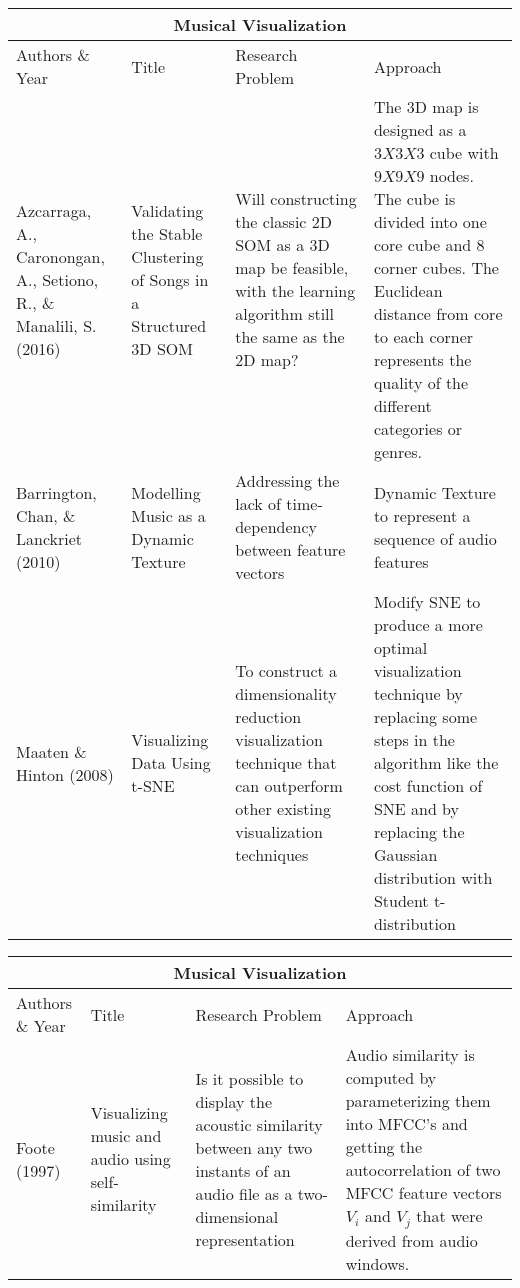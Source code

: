 \begin{center}
\begin{tabular}{ |p{3cm}|p{3cm}|p{3cm}|p{3cm}| }
 \hline
 \multicolumn{4}{|c|}{Musical Visualization} \\
 \hline
 Authors \& Year&Title&Research Problem&Approach\\
\hline
 Azcarraga, A., Caronongan, A., Setiono, R., \& Manalili, S. (2016) & Validating the Stable Clustering of Songs in a Structured 3D SOM & Will constructing the classic 2D SOM as a 3D map be feasible, with the learning algorithm still the same as the 2D map? & The 3D map is designed as a $3X3X3$ cube with $9X9X9$ nodes. The cube is divided into one core cube and 8 corner cubes. The Euclidean distance from core to each corner represents the quality of the different categories or genres. \\
\hline
Barrington, Chan, \& Lanckriet (2010) & Modelling Music as a Dynamic Texture &Addressing the lack of time-dependency between feature vectors & Dynamic Texture to represent a sequence of audio features \\
\hline
Maaten \& Hinton (2008) & Visualizing Data Using t-SNE &To construct a dimensionality reduction visualization technique that can outperform other existing visualization techniques & Modify SNE to produce a more optimal visualization technique by replacing some steps in the algorithm like the cost function of SNE and by replacing the Gaussian distribution with Student t-distribution \\
 \hline
\end{tabular}
\end{center}
\begin{center}
\begin{tabular}{ |p{3cm}|p{3cm}|p{3cm}|p{3cm}| }
 \hline
 \multicolumn{4}{|c|}{Musical Visualization} \\
 \hline
 Authors \& Year&Title&Research Problem&Approach\\
 \hline
 Foote (1997) & Visualizing music and audio using self-similarity & Is it possible to display the acoustic similarity between any two instants of an audio file as a two-dimensional representation & Audio similarity is computed by parameterizing them into MFCC's and getting the autocorrelation of two MFCC feature vectors $V_i$ and $V_j$ that were derived from audio windows. \\
 \hline
\end{tabular}
\end{center}

